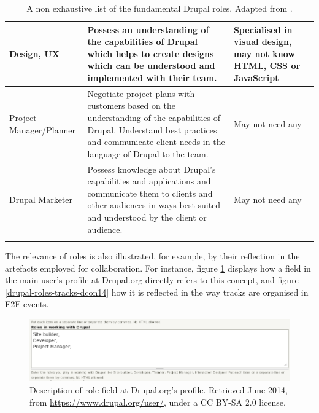 \begin{footnotesize}
\begin{longtable}{|p{3cm}||p{7cm}|p{3cm}|}
Design, UX                    & Possess an understanding of the capabilities of Drupal which helps to create designs which can be understood and implemented with their team.                                                    & Specialised in visual design, may not know HTML, CSS or JavaScript \\ \hline
Project Manager\slash Planner & Negotiate project plans with customers based on the understanding of the capabilities of Drupal. Understand best practices and communicate client needs in the language of Drupal to the team. & May not need any                                                                                     \\ \hline
Drupal Marketer               & Possess knowledge about Drupal's capabilities and applications and communicate them to clients and other audiences in ways best suited and understood by the client or audience.                & May not need any                                                                                     \\ \hline
\caption[List of Drupal roles.]{A non exhaustive list of the fundamental Drupal roles. Adapted from \textcite{drupal-roles-development}.}
\label{tab:drupal-roles}
\end{longtable}
\end{footnotesize}

The relevance of roles is also illustrated, for example, by their reflection in the artefacts employed for collaboration. For instance, figure \ref{roles_profile_dorg} displays how a field in the main user's profile at Drupal.org directly refers to this concept, and figure \ref{drupal-roles-tracks-dcon14} how it is reflected in the way tracks are organised in F2F events.

\begin{figure}[H]
	\centering
	\includegraphics[scale=0.45]{img/roles_profile_dorg.png}
	\caption[Description of role field at Drupal.org's profile]%
    {Description of role field at Drupal.org's profile. Retrieved  June 2014, from \url{https://www.drupal.org/user/}, under a CC BY-SA 2.0 license.}
	\label{roles_profile_dorg}
\end{figure}

